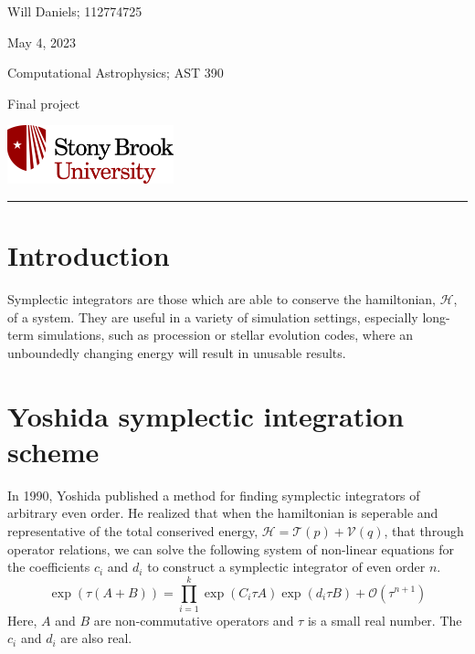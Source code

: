 \documentclass[12pt, letterpaper]{article}
\begin{document}
\noindent
\begin{minipage}{0.5\textwidth}
    Will Daniels; 112774725

    May 4, 2023

    Computational Astrophysics; AST 390

    Final project
\end{minipage}
%
\begin{minipage}{0.5\textwidth}
    \begin{flushright}
        \includegraphics[height = 48pt]{../../LatexAssets/SBULogoStacked}
    \end{flushright}
\end{minipage}
\noindent
\rule{\textwidth}{1pt}

\tableofcontents

\section{Introduction}
Symplectic integrators are those which are able to conserve the hamiltonian,
\(\mathcal{H}\), of a system. They are useful in a variety of simulation
settings, especially long-term simulations, such as procession or stellar
evolution codes, where an unboundedly changing energy will result in unusable
results.

\section{Yoshida symplectic integration scheme}
In 1990, Yoshida published a method for finding symplectic integrators of
arbitrary even order. He realized that when the hamiltonian is seperable and
representative of the total conserived energy, \(\mathcal{H} =
\mathcal{T}(p) + \mathcal{V}(q)\), that through operator relations, we can
solve the following system of non-linear equations for the coefficients \(c_i\)
and \(d_i\) to construct a symplectic integrator of even order \(n\).
\begin{equation}
  \exp(\tau (A + B)) = \prod_{i=1}^k \exp(C_i \tau A) \exp(d_i \tau B)
  + \mathcal{O}(\tau^{n+1})
\end{equation}
Here, \(A\) and \(B\) are non-commutative operators and \(\tau\) is a small
real number. The \(c_i\) and \(d_i\) are also real.
\end{document}
